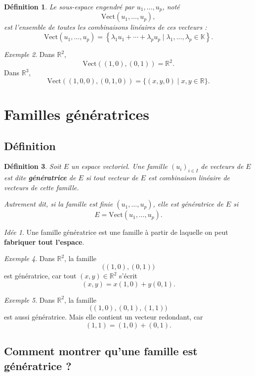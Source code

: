 \documentclass[11pt,a4paper]{article}
\newtheorem{definition}{Définition}[section]
\theoremstyle{remark}
\newtheorem{exemple}[definition]{Exemple}
\newtheorem*{idee}{Idée}
\newcommand{\R}{\mathbb{R}}
\newcommand{\K}{\mathbb{K}}
\newcommand{\Vect}{\mathrm{Vect}}
\begin{document}
\begin{definition}
Le sous-espace engendré par \(u_1,\dots,u_p\), noté
\[
\Vect(u_1,\dots,u_p),
\]
est l’ensemble de toutes les combinaisons linéaires de ces vecteurs :
\[
\Vect(u_1,\dots,u_p)=
\left\{
\lambda_1u_1+\cdots+\lambda_pu_p \mid \lambda_1,\dots,\lambda_p\in\K
\right\}.
\]
\end{definition}

\begin{exemple}
Dans \(\R^2\),
\[
\Vect((1,0),(0,1))=\R^2.
\]
Dans \(\R^3\),
\[
\Vect((1,0,0),(0,1,0))=\{(x,y,0)\mid x,y\in\R\}.
\]
\end{exemple}

\section{Familles génératrices}

\subsection{Définition}

\begin{definition}
Soit \(E\) un espace vectoriel. Une famille \((u_i)_{i\in I}\) de vecteurs de \(E\) est dite \textbf{génératrice} de \(E\) si tout vecteur de \(E\) est combinaison linéaire de vecteurs de cette famille.

Autrement dit, si la famille est finie \((u_1,\dots,u_p)\), elle est génératrice de \(E\) si
\[
E=\Vect(u_1,\dots,u_p).
\]
\end{definition}

\begin{idee}
Une famille génératrice est une famille à partir de laquelle on peut \textbf{fabriquer tout l’espace}.
\end{idee}

\begin{exemple}
Dans \(\R^2\), la famille
\[
\big((1,0),(0,1)\big)
\]
est génératrice, car tout \((x,y)\in\R^2\) s’écrit
\[
(x,y)=x(1,0)+y(0,1).
\]
\end{exemple}

\begin{exemple}
Dans \(\R^2\), la famille
\[
\big((1,0),(0,1),(1,1)\big)
\]
est aussi génératrice. Mais elle contient un vecteur redondant, car
\[
(1,1)=(1,0)+(0,1).
\]
\end{exemple}

\subsection{Comment montrer qu’une famille est génératrice ?}
\end{document}
